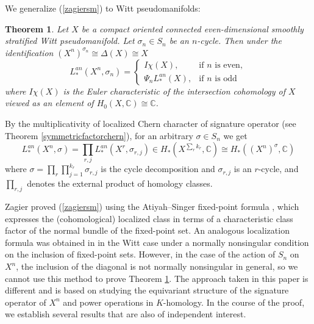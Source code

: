 \documentclass[11pt,leqno,twoside]{amsart}
\theoremstyle{plainsl}
\newtheorem{theorem}{Theorem}[section]
\theoremstyle{definition}
\newcommand{\C}{\mathbb{C}}
\begin{document}
 
 We generalize (\ref{zagiersm}) to Witt pseudomanifolds:
\begin{theorem}\label{equianvtLclasszagiersingular}
    Let $X$ be a compact oriented connected even-dimensional smoothly stratified Witt pseudomanifold.   Let $\sigma_n\in S_n$ be an $n$-cycle. Then under the identification $(X^n)^{\sigma_n}\cong \Delta(X)\cong X$ 
    \[
L^{an}_*(X^n,\sigma_n)=
\begin{cases}
I\chi(X), & \text{if } n \text{ is even},\\[4pt]
\Psi_nL^{an}_*(X), & \text{if } n \text{ is odd}
\end{cases}
\]
where $I\chi(X)$ is the Euler characteristic of the intersection cohomology of $X$ viewed as an element of $H_0(X,\C)\cong \C$.
\end{theorem}



By the multiplicativity of localized Chern character of signature operator  (see Theorem \ref{symmetricfactorchern}), for an arbitrary $\sigma\in S_n$ we get
\begin{equation}
    L_*^{an}(X^n,\sigma)=\prod_{r,j} L^{an}_*(X^r,\sigma_{r,j}) \in  H_*(X^{\sum_r k_r},\C) \cong H_*((X^n)^{\sigma},\C)
\end{equation}
 where $\sigma=\prod_r\prod^{k_r}_{j=1}\sigma_{r,j}$ is the cycle decomposition and $\sigma_{r,j}$ is an $r$-cycle, and $\prod_{r,j}$ denotes the external
product of homology classes.




Zagier proved (\ref{zagiersm}) using the Atiyah–Singer fixed-point formula \cite{AS3}, which expresses the (cohomological) localized class in terms of a characteristic class factor of the normal bundle of the fixed-point set. An analogous localization formula was obtained in \cite{BLP} in the Witt case under a normally nonsingular condition on the inclusion of fixed-point sets. However, in the case of the action of $S_n$ on $X^n$, the inclusion of the diagonal is not normally nonsingular in general, so we cannot use this method to prove Theorem \ref{equianvtLclasszagiersingular}.
The approach taken in this paper is different and is based on
 studying the equivariant structure of the signature operator of $X^n$ and power operations in $K$-homology. In the course of the proof, we establish several results that are also of independent interest.
\end{document}
